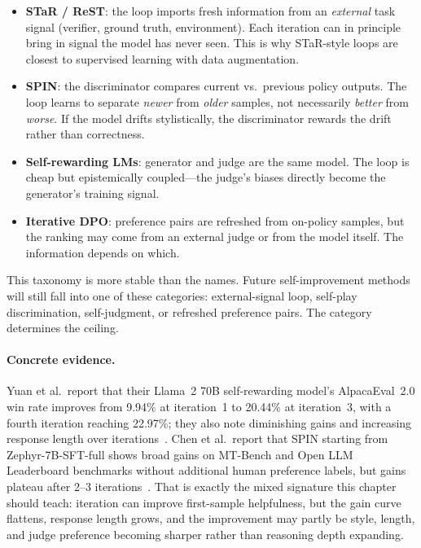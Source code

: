 \begin{itemize}[nosep]
  \item \textbf{STaR / ReST}: the loop imports fresh information from an \emph{external} task signal (verifier, ground truth, environment). Each iteration can in principle bring in signal the model has never seen. This is why STaR-style loops are closest to supervised learning with data augmentation.
  \item \textbf{SPIN}: the discriminator compares current vs.\ previous policy outputs. The loop learns to separate \emph{newer} from \emph{older} samples, not necessarily \emph{better} from \emph{worse}. If the model drifts stylistically, the discriminator rewards the drift rather than correctness.
  \item \textbf{Self-rewarding LMs}: generator and judge are the same model. The loop is cheap but epistemically coupled---the judge's biases directly become the generator's training signal.
  \item \textbf{Iterative DPO}: preference pairs are refreshed from on-policy samples, but the ranking may come from an external judge or from the model itself. The information depends on which.
\end{itemize}

This taxonomy is more stable than the names. Future self-improvement methods will still fall into one of these categories: external-signal loop, self-play discrimination, self-judgment, or refreshed preference pairs. The category determines the ceiling.

\paragraph{Concrete evidence.} Yuan et al.\ report that their Llama~2 70B self-rewarding model's AlpacaEval~2.0 win rate improves from 9.94\% at iteration~1 to 20.44\% at iteration~3, with a fourth iteration reaching 22.97\%; they also note diminishing gains and increasing response length over iterations~\cite{yuan2024selfrewarding}. Chen et al.\ report that SPIN starting from Zephyr-7B-SFT-full shows broad gains on MT-Bench and Open LLM Leaderboard benchmarks without additional human preference labels, but gains plateau after 2--3 iterations~\cite{chen2024spin}. That is exactly the mixed signature this chapter should teach: iteration can improve first-sample helpfulness, but the gain curve flattens, response length grows, and the improvement may partly be style, length, and judge preference becoming sharper rather than reasoning depth expanding.

